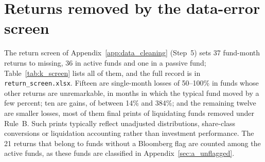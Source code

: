 \documentclass[12pt, oneside]{report}
\begin{document}
\section{Returns removed by the data-error screen}
\label{sec:k_screen}

\noindent The return screen of Appendix~\ref{app:data_cleaning}
(Step~5) sets 37 fund-month returns to missing, 36 in active funds and
one in a passive fund; Table~\ref{tab:k_screen} lists all of them, and
the full record is in \texttt{return\_screen.xlsx}. Fifteen are
single-month losses of 50--100\% in funds whose other returns are
unremarkable, in months in which the typical fund moved by a few percent;
ten are gains, of between 14\% and 384\%; and the remaining twelve are smaller losses, most of them
final prints of liquidating funds removed under Rule~B. Such prints
typically reflect unadjusted distributions, share-class conversions or
liquidation accounting rather than investment performance. The 21 returns
that belong to funds without a Bloomberg flag are counted among the
active funds, as these funds are classified in
Appendix~\ref{sec:a_unflagged}.
\end{document}
